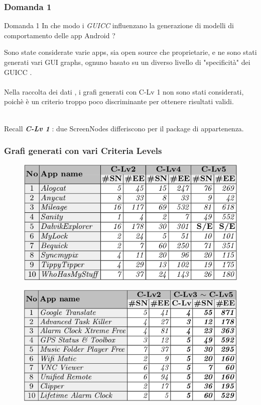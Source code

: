 \documentclass[12pt]{beamer}
\begin{document}
\begin{frame}
\frametitle{Domanda 1}

\begin{block}{Domanda 1}
In che modo i \emph{GUICC} influenzano la generazione di modelli di comportamento delle app Android ?
\end{block}

Sono state considerate varie apps, sia open source che proprietarie, e ne sono stati generati vari GUI graphs, ognuno basato su un diverso livello di "specificit\`a" dei GUICC .
\\~\\

Nella raccolta dei dati , i grafi generati con C-Lv 1 non sono stati considerati, poich\`e \`e un criterio troppo poco discriminante per ottenere risultati validi.
\\~\\

\begin{block}{Recall} 
\textit{\textbf{C-Lv 1}} : due ScreenNodes differiscono per il package di appartenenza.
\end{block}
\end{frame}


\begin{frame}
\frametitle{Grafi generati con vari Criteria Levels}

\begin{figure}
\includegraphics[width=0.55\linewidth]{images/GraphWidthForOpenSource.png}
\end{figure}
\begin{figure}
\includegraphics[width=0.55\linewidth]{images/GraphWidthForGstore.png}
\end{figure}
\end{frame}
\end{document}
